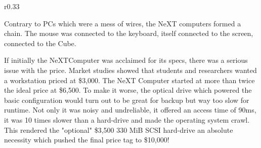 \begin{figure}[H]
\centering
{}
\end{figure}
\pagebreak
 


\begin{wrapfigure}[9]{r}{0.33\textwidth}
\centering
{}
\end{wrapfigure}


Contrary to PCs which were a mess of wires, the NeXT computers formed a chain. The mouse was connected to the keyboard, itself connected to the screen, connected to the Cube.\\


\par


If initially the NeXTComputer was acclaimed for its specs, there was a serious issue with the price. Market studies showed that students and researchers wanted a workstation priced at \$3,000. The NeXT Computer started at more than twice the ideal price at \$6,500. To make it worse, the optical drive which powered the basic configuration would turn out to be great for backup but way too slow for runtime. Not only it was noisy and undreliable, it offered an access time of 90ms, it was 10 times slower than a hard-drive and made the operating system crawl. This rendered the "optional" \$3,500 330 MiB SCSI hard-drive an absolute necessity which pushed the final price tag to \$10,000!\\
\par




